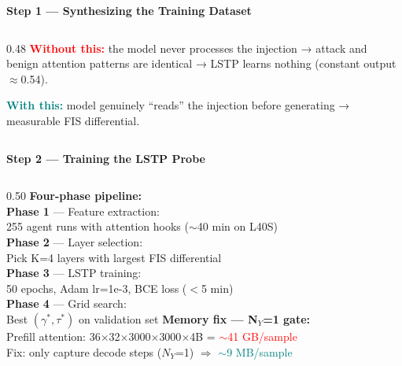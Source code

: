 \documentclass[aspectratio=169]{beamer}
\begin{document}
\begin{frame}{\textcolor{cmindsblue}{\textbf{Step 1 — Synthesizing the Training Dataset}}}
\begin{columns}[T]
\begin{column}{0.48\textwidth}
      \vspace{3mm}
      {\small \textcolor{red}{\textbf{Without this:}} the model never processes
      the injection → attack and benign attention patterns are identical →
      LSTP learns nothing (constant output $\approx$0.54).}

      \vspace{2mm}
      {\small \textcolor{teal}{\textbf{With this:}} model genuinely ``reads''
      the injection before generating → measurable FIS differential.}
    \end{column}
  \end{columns}
\end{frame}


\begin{frame}{\textcolor{cmindsblue}{\textbf{Step 2 — Training the LSTP Probe}}}
  \vspace{-0.3cm}
  \begin{columns}[T]
    \begin{column}{0.50\textwidth}
      \textcolor{cmindsblue}{\textbf{Four-phase pipeline:}}\\[2pt]
      {\small
      \textbf{Phase 1} — Feature extraction:\\
      255 agent runs with attention hooks ($\sim$40 min on L40S)\\[2pt]
      \textbf{Phase 2} — Layer selection:\\
      Pick K=4 layers with largest FIS differential\\[2pt]
      \textbf{Phase 3} — LSTP training:\\
      50 epochs, Adam lr=1e-3, BCE loss ($<$5 min)\\[2pt]
      \textbf{Phase 4} — Grid search:\\
      Best $(\gamma^*, \tau^*)$ on validation set
      }
      \vspace{3mm}
      \textcolor{cmindsblue}{\textbf{Memory fix — N$_Y$=1 gate:}}\\
      {\scriptsize Prefill attention: 36$\times$32$\times$3000$\times$3000$\times$4B = \textcolor{red}{$\sim$41 GB/sample}\\
      Fix: only capture decode steps ($N_Y$=1) $\Rightarrow$ \textcolor{teal}{$\sim$9 MB/sample}}
    \end{column}


\end{columns}
\end{frame}
\end{document}
